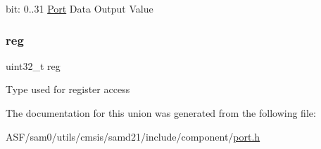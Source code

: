 bit\+: 0..31 \mbox{\hyperlink{struct_port}{Port}} Data Output Value \mbox{\label{union_p_o_r_t___o_u_t___type_a6b91636401516a477989a336376d7b40}} 
\subsubsection{\texorpdfstring{reg}{reg}}
{\footnotesize\ttfamily uint32\+\_\+t reg}

Type used for register access 

The documentation for this union was generated from the following file\+:\begin{DoxyCompactItemize}
\item 
A\+S\+F/sam0/utils/cmsis/samd21/include/component/\mbox{\hyperlink{utils_2cmsis_2samd21_2include_2component_2port_8h}{port.\+h}}\end{DoxyCompactItemize}
